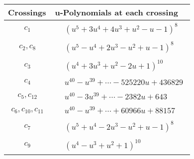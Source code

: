 \documentclass[1p]{elsarticle_modified}
\theoremstyle{definition}
\begin{document}
\begin{tabular}{m{50pt}|m{274pt}}
Crossings & \hspace{64pt}u-Polynomials at each crossing \\
\hline $$\begin{aligned}c_{1}\end{aligned}$$&$\begin{aligned}
&(u^5+3 u^4+4 u^3+u^2- u-1)^8
\end{aligned}$\\
\hline $$\begin{aligned}c_{2},c_{8}\end{aligned}$$&$\begin{aligned}
&(u^5- u^4+2 u^3- u^2+u-1)^8
\end{aligned}$\\
\hline $$\begin{aligned}c_{3}\end{aligned}$$&$\begin{aligned}
&(u^4+3 u^3+u^2-2 u+1)^{10}
\end{aligned}$\\
\hline $$\begin{aligned}c_{4}\end{aligned}$$&$\begin{aligned}
&u^{40}- u^{39}+\cdots-525220 u+436829
\end{aligned}$\\
\hline $$\begin{aligned}c_{5},c_{12}\end{aligned}$$&$\begin{aligned}
&u^{40}-3 u^{39}+\cdots-2382 u+643
\end{aligned}$\\
\hline $$\begin{aligned}c_{6},c_{10},c_{11}\end{aligned}$$&$\begin{aligned}
&u^{40}- u^{39}+\cdots+60966 u+88157
\end{aligned}$\\
\hline $$\begin{aligned}c_{7}\end{aligned}$$&$\begin{aligned}
&(u^5+u^4-2 u^3- u^2+u-1)^8
\end{aligned}$\\
\hline $$\begin{aligned}c_{9}\end{aligned}$$&$\begin{aligned}
&(u^4- u^3+u^2+1)^{10}
\end{aligned}$\\
\hline
\end{tabular}\\~\\
\end{document}
